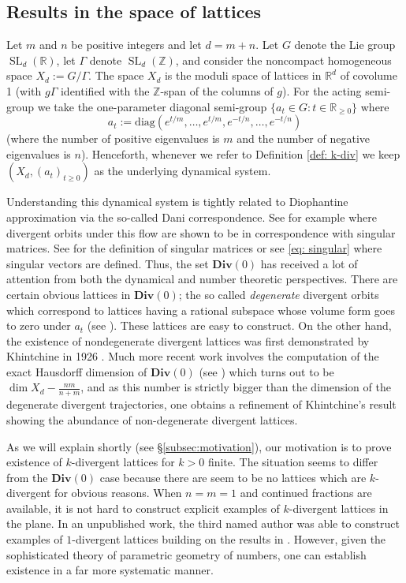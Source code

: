 \documentclass[reqno,11pt]{amsart}
\theoremstyle{plain}
\theoremstyle{definition}
\theoremstyle{remark}
\numberwithin{equation}{section}
\newcommand{\D}{\mathbf{Div}}
\newcommand{\SL}{\operatorname{SL}}
\newcommand{\R}{{\mathbb{R}}}
\newcommand{\Z}{{\mathbb{Z}}}
\begin{document}
\subsection{Results in the space of lattices}

Let $m$ and $n$ be positive integers and let $d=m+n$.
Let $G$ denote the Lie group $\SL_d(\R)$, let $\Gamma$ denote $\SL_d(\Z)$, and consider the noncompact homogeneous space $X_d:=G/\Gamma$. The space $X_d$ is the moduli space of lattices in $\R^d$ of covolume 1 (with $g\Gamma$ identified with the $\Z$-span of the columns of $g$). 
For the acting semi-group we take the one-parameter diagonal semi-group
$\{a_t \in G:t\in \R_{\geq 0}\}$ where 
\begin{equation}\label{at-standard}
    a_t := \text{diag}(e^{t/m}, \dots, e^{t/m}, e^{-t/n},\dots, e^{-t/n})
\end{equation}
(where the number of positive eigenvalues is $m$ and the number of negative eigenvalues is $n$). Henceforth, whenever we refer to Definition \ref{def: k-div} we keep $(X_d, (a_t)_{t\geq 0})$ as the underlying dynamical system.

Understanding {this} dynamical system is tightly related to Diophantine approximation via the so-called Dani correspondence. See for example \cite[Theorem 2.14]{Da} where divergent orbits under this flow are shown to be in correspondence with singular matrices. See \cite[Definition 2.13]{Da} for the definition of singular matrices or  see \eqref{eq: singular} where singular vectors are defined. 
Thus, the set $\D(0)$ has received a lot of attention from both the dynamical and number theoretic perspectives.
There are certain obvious lattices in $\D(0)$; the so called \textit{degenerate} divergent orbits which correspond to lattices having a rational subspace whose volume form goes to zero under $a_t$ (see \cite[Definition 2.8]{Da}). These lattices are easy to construct. On the other hand, the existence of nondegenerate divergent lattices was first demonstrated by Khintchine in 1926 \cite{Kh}. Much more recent work involves the computation of the exact Hausdorff dimension of $\D(0)$ (see \cite{C, CC, KKLM, DFSU, So}) which turns out to be 
$\dim X_d - \frac{nm}{n+m}$, and as this number is strictly bigger than the dimension of the degenerate divergent trajectories, one obtains a refinement of Khintchine's result showing the abundance of non-degenerate divergent lattices.

As we will explain shortly (see \S\ref{subsec:motivation}), our motivation {is} to prove existence of $k$-divergent lattices for 
$k>0$ finite. 
The situation seems to differ from the $\D(0)$ case because there are seem to be no lattices
which are $k$-divergent for obvious reasons. When $n=m=1$ and continued fractions are available, it is not hard to construct explicit examples of $k$-divergent lattices in the plane. 
In an unpublished work, the third named 
author was able to construct examples of $1$-divergent lattices building on the results in \cite{Sh2}. However, given the sophisticated theory of parametric geometry of numbers, one can establish existence in a far more systematic manner. 
\end{document}
